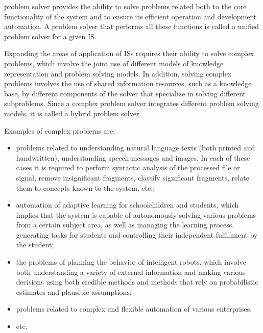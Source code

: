 \documentclass [11pt, a4paper]{article}
\begin{document}
\begin{multicols}{2}
problem solver provides the ability to solve problems
related both to the core functionality of the system
and to ensure its efficient operation and development
automation. A problem solver that performs all these
functions is called a unified problem solver for a given
IS. \par \quad Expanding the areas of application of ISs requires
their ability to solve complex problems, which involve
the joint use of different models of knowledge representation and problem solving models. In addition, solving complex problems involves the use of shared information
resources, such as a knowledge base, by different components of the solver that specialize in solving different subproblems. Since a complex problem solver integrates
different problem solving models, it is called a hybrid
problem solver. \par \quad Examples of complex problems are:
\begin{itemize} 
 \item problems related to understanding natural language
texts (both printed and handwritten), understanding
speech messages and images. In each of these cases
it is required to perform syntactic analysis of the
processed file or signal, remove insignificant fragments, classify significant fragments, relate them to
concepts known to the system, etc.;
 \item  automation of adaptive learning for schoolchildren
and students, which implies that the system is capable of autonomously solving various problems
from a certain subject area, as well as managing
the learning process, generating tasks for students
and controlling their independent fulfillment by the
student;
 \item the problems of planning the behavior of intelligent robots, which involve both understanding a
variety of external information and making various
decisions using both credible methods and methods
that rely on probabilistic estimates and plausible
assumptions;
 \item problems related to complex and flexible automation
of various enterprises.
 \item etc.


\end{itemize}
\end{multicols}
\end{document}
